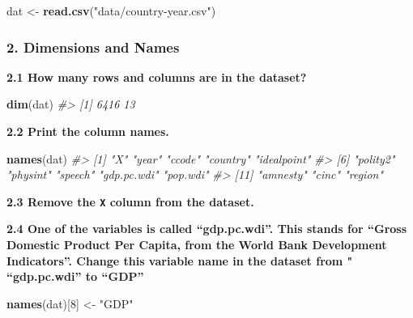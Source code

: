 \documentclass[]{book}
\newenvironment{Shaded}{\begin{snugshade}}{\end{snugshade}}
\newcommand{\CommentTok}[1]{\textcolor[rgb]{0.56,0.35,0.01}{\textit{#1}}}
\newcommand{\DecValTok}[1]{\textcolor[rgb]{0.00,0.00,0.81}{#1}}
\newcommand{\KeywordTok}[1]{\textcolor[rgb]{0.13,0.29,0.53}{\textbf{#1}}}
\newcommand{\NormalTok}[1]{#1}
\newcommand{\OperatorTok}[1]{\textcolor[rgb]{0.81,0.36,0.00}{\textbf{#1}}}
\newcommand{\OtherTok}[1]{\textcolor[rgb]{0.56,0.35,0.01}{#1}}
\newcommand{\StringTok}[1]{\textcolor[rgb]{0.31,0.60,0.02}{#1}}
\begin{document}
\begin{Shaded}
\begin{Highlighting}[]
\NormalTok{dat <-}\StringTok{ }\KeywordTok{read.csv}\NormalTok{(}\StringTok{"data/country-year.csv"}\NormalTok{)}
\end{Highlighting}
\end{Shaded}

\hypertarget{dimensions-and-names}{%
\subsubsection*{2. Dimensions and Names}\label{dimensions-and-names}}

\textbf{2.1 How many rows and columns are in the dataset?}

\begin{Shaded}
\begin{Highlighting}[]
\KeywordTok{dim}\NormalTok{(dat)}
\CommentTok{#> [1] 6416   13}
\end{Highlighting}
\end{Shaded}

\textbf{2.2 Print the column names.}

\begin{Shaded}
\begin{Highlighting}[]
\KeywordTok{names}\NormalTok{(dat)}
\CommentTok{#>  [1] "X"          "year"       "ccode"      "country"    "idealpoint"}
\CommentTok{#>  [6] "polity2"    "physint"    "speech"     "gdp.pc.wdi" "pop.wdi"   }
\CommentTok{#> [11] "amnesty"    "cinc"       "region"}
\end{Highlighting}
\end{Shaded}

\textbf{2.3 Remove the \texttt{X} column from the dataset.}

\begin{Shaded}
\end{Shaded}

\textbf{2.4 One of the variables is called ``gdp.pc.wdi''. This stands for ``Gross Domestic Product Per Capita, from the World Bank Development Indicators''. Change this variable name in the dataset from " ``gdp.pc.wdi'' to ``GDP''}

\begin{Shaded}
\begin{Highlighting}[]
\KeywordTok{names}\NormalTok{(dat)[}\DecValTok{8}\NormalTok{] <-}\StringTok{ "GDP"}
\end{Highlighting}
\end{Shaded}
\end{document}
